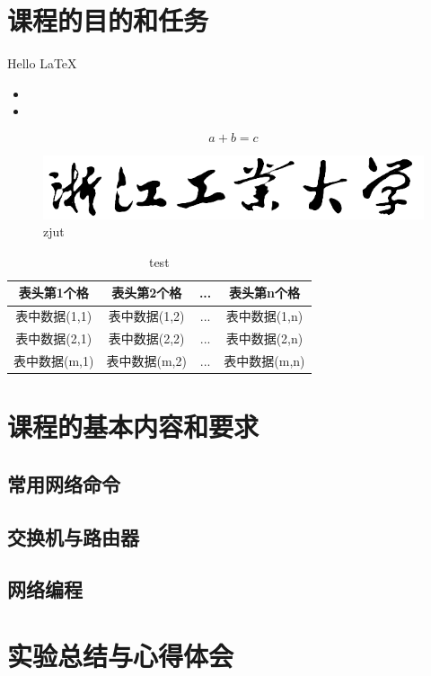 \section{课程的目的和任务}
Hello \LaTeX

\begin{itemize}
    \item 
    \item
\end{itemize}

\begin{equation}
    a+b=c
\end{equation}

\begin{figure}[H]
    \centering
    \includegraphics[width=5in]{figures/zjut.png}
    \caption{zjut}
\end{figure}

\begin{table}[H]
    \caption[标签名]{test}
    \centering
    \begin{tabular}{cccc}
    \hline
    表头第1个格 & 表头第2个格 & ... & 表头第n个格 \\
    \hline
    表中数据(1,1) & 表中数据(1,2) & ... & 表中数据(1,n)\\
    表中数据(2,1) & 表中数据(2,2) & ... & 表中数据(2,n)\\
    表中数据(m,1) & 表中数据(m,2) & ... & 表中数据(m,n)\\
    \hline
    \end{tabular}
\end{table}

\section{课程的基本内容和要求}
\subsection{常用网络命令}
\subsection{交换机与路由器}
\subsection{网络编程}

\section{实验总结与心得体会}